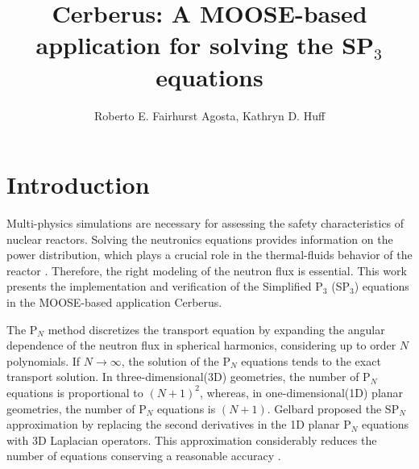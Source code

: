 \documentclass{anstrans}
\title{Cerberus: A MOOSE-based application for solving the SP$_3$ equations}
\author{Roberto E. Fairhurst Agosta, Kathryn D. Huff}
\institute{
University of Illinois at Urbana-Champaign, Dept. of Nuclear, Plasma, and Radiological Engineering\\
ref3@illinois.edu
}
\begin{document}



\section{Introduction}

Multi-physics simulations are necessary for assessing the safety characteristics of nuclear reactors.
Solving the neutronics equations provides information on the power distribution, which plays a crucial role in the thermal-fluids behavior of the reactor \cite{fairhurst-agosta_multi-physics_2020}.
Therefore, the right modeling of the neutron flux is essential.
This work presents the implementation and verification of the Simplified P$_3$ (SP$_3$) equations \cite{gelbard_spherical_1960} in the \gls{MOOSE}-based application Cerberus.

The P$_N$ method \cite{davidson_neutron_1957} discretizes the transport equation by expanding the angular dependence of the neutron flux in spherical harmonics, considering up to order $N$ polynomials.
If $N \rightarrow \infty$, the solution of the P$_N$ equations tends to the exact transport solution.
In three-dimensional(3D) geometries, the number of P$_N$ equations is proportional to $(N+1)^2$, whereas, in one-dimensional(1D) planar geometries, the number of P$_N$ equations is $(N+1)$.
Gelbard \cite{gelbard_spherical_1960} proposed the SP$_N$ approximation by replacing the second derivatives in the 1D planar P$_N$ equations with 3D Laplacian operators.
This approximation considerably reduces the number of equations conserving a reasonable accuracy \cite{capilla_applications_2009}.
\end{document}
